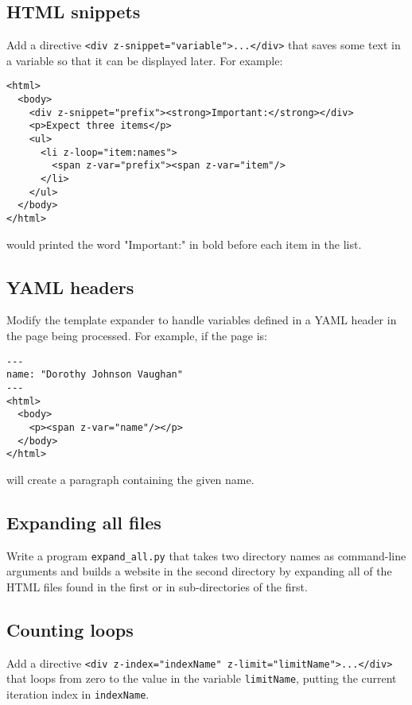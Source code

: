 \documentclass{scrbook}
\begin{document}
\subsection*{HTML snippets}


Add a directive \texttt{<div z-snippet="variable">...</div>} that saves some text in a variable
so that it can be displayed later.
For example:

\begin{lstlisting}[frame=single,frameround=tttt]
<html>
  <body>
    <div z-snippet="prefix"><strong>Important:</strong></div>
    <p>Expect three items</p>
    <ul>
      <li z-loop="item:names">
        <span z-var="prefix"><span z-var="item"/>
      </li>
    </ul>
  </body>
</html>
\end{lstlisting}


\noindent would printed the word "Important:" in bold before each item in the list.

\subsection*{YAML headers}


Modify the template expander to handle variables defined in a YAML header in the page being processed.
For example, if the page is:

\begin{lstlisting}[frame=single,frameround=tttt]
---
name: "Dorothy Johnson Vaughan"
---
<html>
  <body>
    <p><span z-var="name"/></p>
  </body>
</html>
\end{lstlisting}


\noindent will create a paragraph containing the given name.

\subsection*{Expanding all files}


Write a program \texttt{expand\_all.py} that takes two directory names as command-line arguments
and builds a website in the second directory by expanding all of the HTML files found in the first
or in sub-directories of the first.

\subsection*{Counting loops}


Add a directive \texttt{<div z-index="indexName" z-limit="limitName">...</div>}
that loops from zero to the value in the variable \texttt{limitName},
putting the current iteration index in \texttt{indexName}.
\end{document}
